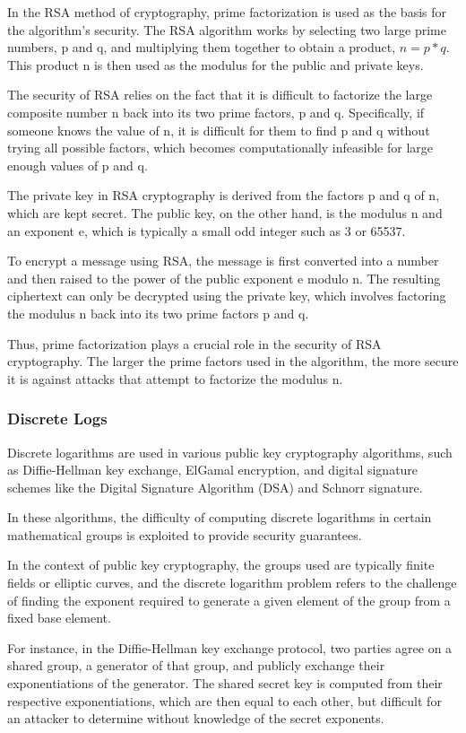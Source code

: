 \documentclass{article}
\begin{document}
In the RSA method of cryptography, prime factorization is used as the basis for the algorithm's security. The RSA algorithm works by selecting two large prime numbers, p and q, and multiplying them together to obtain a product, $n = p*q$. This product n is then used as the modulus for the public and private keys.

The security of RSA relies on the fact that it is difficult to factorize the large composite number n back into its two prime factors, p and q. Specifically, if someone knows the value of n, it is difficult for them to find p and q without trying all possible factors, which becomes computationally infeasible for large enough values of p and q.

The private key in RSA cryptography is derived from the factors p and q of n, which are kept secret. The public key, on the other hand, is the modulus n and an exponent e, which is typically a small odd integer such as 3 or 65537.

To encrypt a message using RSA, the message is first converted into a number and then raised to the power of the public exponent e modulo n. The resulting ciphertext can only be decrypted using the private key, which involves factoring the modulus n back into its two prime factors p and q.

Thus, prime factorization plays a crucial role in the security of RSA cryptography. The larger the prime factors used in the algorithm, the more secure it is against attacks that attempt to factorize the modulus n.

\subsubsection{Discrete Logs}
Discrete logarithms are used in various public key cryptography algorithms, such as Diffie-Hellman key exchange, ElGamal encryption, and digital signature schemes like the Digital Signature Algorithm (DSA) and Schnorr signature.

In these algorithms, the difficulty of computing discrete logarithms in certain mathematical groups is exploited to provide security guarantees.

In the context of public key cryptography, the groups used are typically finite fields or elliptic curves, and the discrete logarithm problem refers to the challenge of finding the exponent required to generate a given element of the group from a fixed base element.

For instance, in the Diffie-Hellman key exchange protocol, two parties agree on a shared group, a generator of that group, and publicly exchange their exponentiations of the generator. The shared secret key is computed from their respective exponentiations, which are then equal to each other, but difficult for an attacker to determine without knowledge of the secret exponents.
\end{document}
